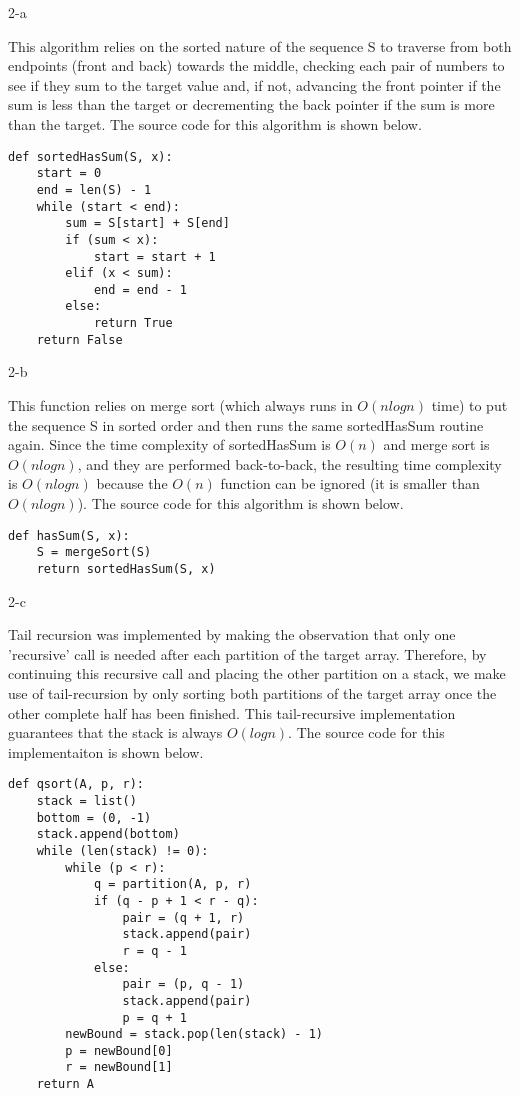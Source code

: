 \documentclass[11pt]{article}
\begin{document}
\begin{prob}{2-a}
\end{prob}
\begin{sol}
This algorithm relies on the sorted nature of the sequence S to traverse from both endpoints (front and back) towards the middle, checking each pair of numbers to see if they sum to the target value and, if not, advancing the front pointer if the sum is less than the target or decrementing the back pointer if the sum is more than the target. The source code for this algorithm is shown below.
\begin{lstlisting}
def sortedHasSum(S, x):
	start = 0
	end = len(S) - 1
	while (start < end):
		sum = S[start] + S[end]
		if (sum < x):
			start = start + 1
		elif (x < sum):
			end = end - 1
		else:
			return True
	return False
\end{lstlisting}
\end{sol}

\begin{prob}{2-b}
\end{prob}
\begin{sol}
This function relies on merge sort (which always runs in $O(nlogn)$ time) to put the sequence S in sorted order and then runs the same sortedHasSum routine again. Since the time complexity of sortedHasSum is $O(n)$ and merge sort is $O(nlogn)$, and they are performed back-to-back, the resulting time complexity is $O(nlogn)$ because the $O(n)$ function can be ignored (it is smaller than $O(nlogn)$). The source code for this algorithm is shown below.

\begin{lstlisting}
def hasSum(S, x):
	S = mergeSort(S)
	return sortedHasSum(S, x)
\end{lstlisting}
\end{sol}

\begin{prob}{2-c}
\end{prob}
\begin{sol}
Tail recursion was implemented by making the observation that only one 'recursive' call is needed after each partition of the target array. Therefore, by continuing this recursive call and placing the other partition on a stack, we make use of tail-recursion by only sorting both partitions of the target array once the other complete half has been finished. This tail-recursive implementation guarantees that the stack is always $O(logn)$. The source code for this implementaiton is shown below.

\begin{lstlisting}
def qsort(A, p, r):
	stack = list()
	bottom = (0, -1)
	stack.append(bottom)
	while (len(stack) != 0):
		while (p < r):
			q = partition(A, p, r)
			if (q - p + 1 < r - q):
				pair = (q + 1, r)
				stack.append(pair)
				r = q - 1
			else:
				pair = (p, q - 1)
				stack.append(pair)
				p = q + 1
		newBound = stack.pop(len(stack) - 1)
		p = newBound[0]
		r = newBound[1]
	return A
\end{lstlisting}
\end{sol}
\end{document}
